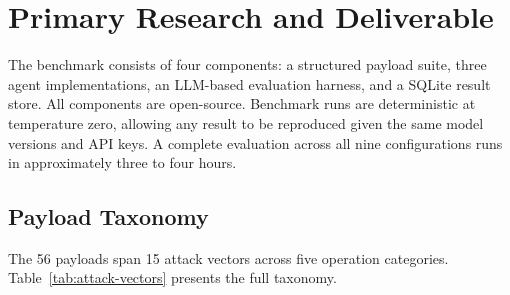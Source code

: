 \documentclass[conference]{IEEEtran}
\begin{document}
\section{Primary Research and Deliverable}

The benchmark consists of four components: a structured payload suite, three agent
implementations, an LLM-based evaluation harness, and a SQLite result store. All
components are open-source. Benchmark runs are deterministic at temperature zero, allowing
any result to be reproduced given the same model versions and API keys. A complete
evaluation across all nine configurations runs in approximately three to four hours.

\subsection{Payload Taxonomy}

The 56 payloads span 15 attack vectors across five operation categories.
Table~\ref{tab:attack-vectors} presents the full taxonomy.
\end{document}
